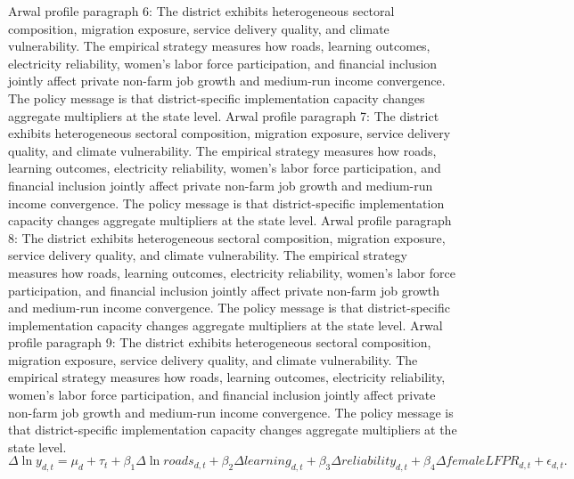 \documentclass[preprint,12pt]{elsarticle}
\begin{document}
Arwal profile paragraph 6: The district exhibits heterogeneous sectoral composition, migration exposure, service delivery quality, and climate vulnerability. The empirical strategy measures how roads, learning outcomes, electricity reliability, women's labor force participation, and financial inclusion jointly affect private non-farm job growth and medium-run income convergence. The policy message is that district-specific implementation capacity changes aggregate multipliers at the state level.
Arwal profile paragraph 7: The district exhibits heterogeneous sectoral composition, migration exposure, service delivery quality, and climate vulnerability. The empirical strategy measures how roads, learning outcomes, electricity reliability, women's labor force participation, and financial inclusion jointly affect private non-farm job growth and medium-run income convergence. The policy message is that district-specific implementation capacity changes aggregate multipliers at the state level.
Arwal profile paragraph 8: The district exhibits heterogeneous sectoral composition, migration exposure, service delivery quality, and climate vulnerability. The empirical strategy measures how roads, learning outcomes, electricity reliability, women's labor force participation, and financial inclusion jointly affect private non-farm job growth and medium-run income convergence. The policy message is that district-specific implementation capacity changes aggregate multipliers at the state level.
Arwal profile paragraph 9: The district exhibits heterogeneous sectoral composition, migration exposure, service delivery quality, and climate vulnerability. The empirical strategy measures how roads, learning outcomes, electricity reliability, women's labor force participation, and financial inclusion jointly affect private non-farm job growth and medium-run income convergence. The policy message is that district-specific implementation capacity changes aggregate multipliers at the state level.
\begin{equation}\Delta \ln y_{d,t}=\mu_d+\tau_t+\beta_1\Delta\ln roads_{d,t}+\beta_2\Delta learning_{d,t}+\beta_3\Delta reliability_{d,t}+\beta_4\Delta femaleLFPR_{d,t}+\epsilon_{d,t}.\end{equation}
\end{document}
